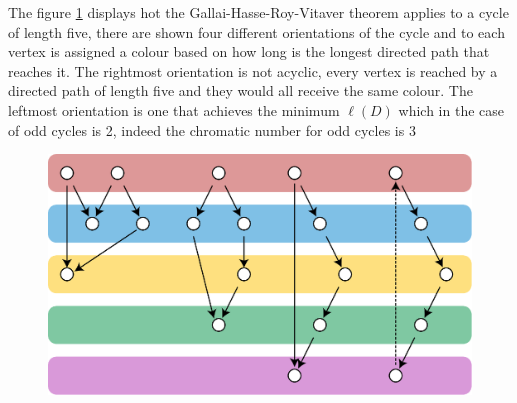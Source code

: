 \documentclass[a4paper,12pt,twoside]{book}
\begin{document}
\newpage 
The figure \ref{fig-vitaver} displays hot the Gallai-Hasse-Roy-Vitaver theorem applies to a cycle of length five, there are shown four different orientations of the cycle and to each vertex is assigned a colour based on how long is the longest directed path that reaches it. The rightmost orientation is not acyclic, every vertex is reached by a directed path of length five and they would all receive the same colour. The leftmost orientation is one that achieves the minimum $\ell(D)$ which in the case of odd cycles is 2, indeed the chromatic number for odd cycles is 3
\vspace{2cm}
\begin{figure}[h]
\centering\includegraphics[scale=0.7]{vitaver.eps}
\caption{ }\label{fig-vitaver}
\end{figure}

\newpage
\end{document}
